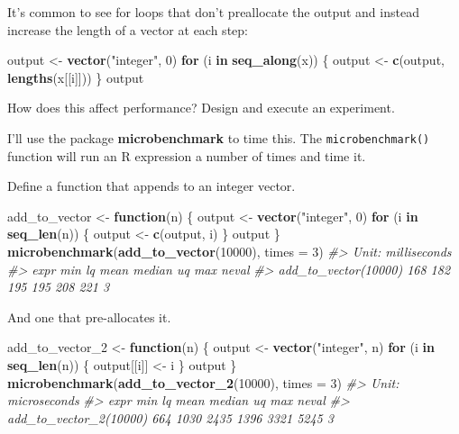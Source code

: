 \documentclass[]{book}
\newenvironment{Shaded}{\begin{snugshade}}{\end{snugshade}}
\newcommand{\CommentTok}[1]{\textcolor[rgb]{0.56,0.35,0.01}{\textit{#1}}}
\newcommand{\ControlFlowTok}[1]{\textcolor[rgb]{0.13,0.29,0.53}{\textbf{#1}}}
\newcommand{\DataTypeTok}[1]{\textcolor[rgb]{0.13,0.29,0.53}{#1}}
\newcommand{\DecValTok}[1]{\textcolor[rgb]{0.00,0.00,0.81}{#1}}
\newcommand{\KeywordTok}[1]{\textcolor[rgb]{0.13,0.29,0.53}{\textbf{#1}}}
\newcommand{\NormalTok}[1]{#1}
\newcommand{\StringTok}[1]{\textcolor[rgb]{0.31,0.60,0.02}{#1}}
\theoremstyle{plain}
\theoremstyle{remark}
\theoremstyle{definition}
\theoremstyle{definition}
\theoremstyle{definition}
\theoremstyle{remark}
\begin{document}
It's common to see for loops that don't preallocate the output and
instead increase the length of a vector at each step:

\begin{Shaded}
\begin{Highlighting}[]
\NormalTok{output <-}\StringTok{ }\KeywordTok{vector}\NormalTok{(}\StringTok{"integer"}\NormalTok{, }\DecValTok{0}\NormalTok{)}
\ControlFlowTok{for}\NormalTok{ (i }\ControlFlowTok{in} \KeywordTok{seq_along}\NormalTok{(x)) \{}
\NormalTok{  output <-}\StringTok{ }\KeywordTok{c}\NormalTok{(output, }\KeywordTok{lengths}\NormalTok{(x[[i]]))}
\NormalTok{\}}
\NormalTok{output}
\end{Highlighting}
\end{Shaded}

How does this affect performance? Design and execute an experiment.

I'll use the package \textbf{microbenchmark} to time this. The
\texttt{microbenchmark()} function will run an R expression a number of
times and time it.

Define a function that appends to an integer vector.

\begin{Shaded}
\begin{Highlighting}[]
\NormalTok{add_to_vector <-}\StringTok{ }\ControlFlowTok{function}\NormalTok{(n) \{}
\NormalTok{  output <-}\StringTok{ }\KeywordTok{vector}\NormalTok{(}\StringTok{"integer"}\NormalTok{, }\DecValTok{0}\NormalTok{)}
  \ControlFlowTok{for}\NormalTok{ (i }\ControlFlowTok{in} \KeywordTok{seq_len}\NormalTok{(n)) \{}
\NormalTok{    output <-}\StringTok{ }\KeywordTok{c}\NormalTok{(output, i)}
\NormalTok{  \}}
\NormalTok{  output  }
\NormalTok{\}}
\KeywordTok{microbenchmark}\NormalTok{(}\KeywordTok{add_to_vector}\NormalTok{(}\DecValTok{10000}\NormalTok{), }\DataTypeTok{times =} \DecValTok{3}\NormalTok{)}
\CommentTok{#> Unit: milliseconds}
\CommentTok{#>                  expr min  lq mean median  uq max neval}
\CommentTok{#>  add_to_vector(10000) 168 182  195    195 208 221     3}
\end{Highlighting}
\end{Shaded}

And one that pre-allocates it.

\begin{Shaded}
\begin{Highlighting}[]
\NormalTok{add_to_vector_}\DecValTok{2}\NormalTok{ <-}\StringTok{ }\ControlFlowTok{function}\NormalTok{(n) \{}
\NormalTok{  output <-}\StringTok{ }\KeywordTok{vector}\NormalTok{(}\StringTok{"integer"}\NormalTok{, n)}
  \ControlFlowTok{for}\NormalTok{ (i }\ControlFlowTok{in} \KeywordTok{seq_len}\NormalTok{(n)) \{}
\NormalTok{    output[[i]] <-}\StringTok{ }\NormalTok{i}
\NormalTok{  \}}
\NormalTok{  output}
\NormalTok{\}}
\KeywordTok{microbenchmark}\NormalTok{(}\KeywordTok{add_to_vector_2}\NormalTok{(}\DecValTok{10000}\NormalTok{), }\DataTypeTok{times =} \DecValTok{3}\NormalTok{)}
\CommentTok{#> Unit: microseconds}
\CommentTok{#>                    expr min   lq mean median   uq  max neval}
\CommentTok{#>  add_to_vector_2(10000) 664 1030 2435   1396 3321 5245     3}
\end{Highlighting}
\end{Shaded}
\end{document}

